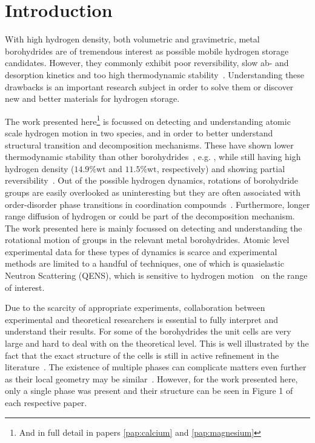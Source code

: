 \section{Introduction}
\label{sec:borohydrides-introduction}
With high hydrogen density, both volumetric and gravimetric, metal borohydrides are of tremendous interest as possible mobile hydrogen storage candidates.
However, they commonly exhibit poor reversibility, slow ab- and desorption kinetics and too high thermodynamic stability~\cite{lithium-stability-2003, borohydride-stability-2006, calcium-stability-2006}.
Understanding these drawbacks is an important research subject in order to solve them or discover new and better materials for hydrogen storage.

The work presented here\footnote{And in full detail in papers \ref{pap:calcium} and \ref{pap:magnesium}} is focussed on detecting and understanding atomic scale hydrogen motion in two species,  and  in order to better understand structural transition and decomposition mechanisms.
These have shown lower thermodynamic stability than other borohydrides~\cite{borohydride-stability-2006, calcium-stability-2006}, e.g. , while still having high hydrogen density ($14.9\%\text{wt}$ and $11.5\%\text{wt}$, respectively) and showing partial reversibility~\cite{magnesium-reversibility-severa-2010, magnesium-reversibility-chong-2011, calcium-reversibility-2007, calcium-reversibility-2008, reversibility-destabilisation-2008}.
Out of the possible hydrogen dynamics, rotations of borohydride groups are easily overlooked as uninteresting but they are often associated with order-disorder phase transitions in coordination compounds~\cite{order-disorder-2010, order-disorder-2006}.
Furthermore, longer range diffusion of hydrogen or  could be part of the decomposition mechanism.
The work presented here is mainly focussed on detecting and understanding the rotational motion of  groups in the relevant metal borohydrides.
Atomic level experimental data for these types of dynamics is scarce and experimental methods are limited to a handful of techniques, one of which is quasielastic Neutron Scattering (QENS), which is sensitive to hydrogen motion~\cite{qens-bee-1988} on the range of interest.

Due to the scarcity of appropriate experiments, collaboration between experimental and theoretical researchers is essential to fully interpret and understand their results.
For some of the borohydrides the unit cells are very large and hard to deal with on the theoretical level.
This is well illustrated by the fact that the exact structure of the cells is still in active refinement in the literature~\cite{cabh42-structure-p42m, cabh42-structure-p4}.
The existence of multiple phases can complicate matters even further as their local geometry may be similar~\cite{mgbh42-structure-fddd, mgbh42-phases-2007, mgbh42-phases-2008, mgbh42-phases-2009}.
However, for the work presented here, only a single phase was present and their structure can be seen in Figure 1 of each respective paper.
